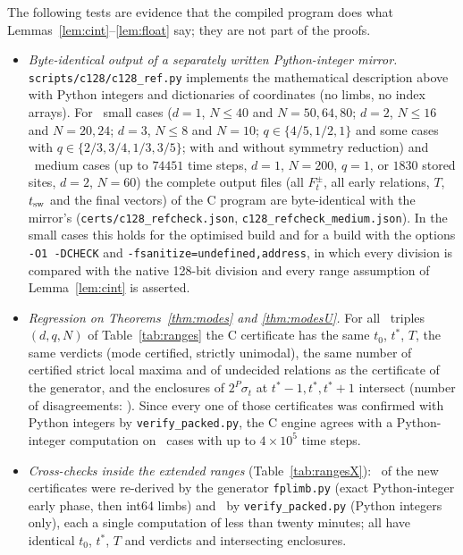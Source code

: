 The following tests are evidence that the compiled program does what Lemmas~\ref{lem:cint}--\ref{lem:float} say; they are not part of the proofs.
\begin{itemize}
\item[(V1)] \emph{Byte-identical output of a separately written Python-integer mirror.} \texttt{scripts/c128/c128\_ref.py} implements the mathematical description above with Python integers and dictionaries of coordinates (no limbs, no index arrays). For \XRefSmall\ small cases ($d=1$, $N\le40$ and $N=50,64,80$; $d=2$, $N\le16$ and $N=20,24$; $d=3$, $N\le8$ and $N=10$; $q\in\{4/5,1/2,1\}$ and some cases with $q\in\{2/3,3/4,1/3,3/5\}$; with and without symmetry reduction) and \XRefMedium\ medium cases (up to $74451$ time steps, $d=1$, $N=200$, $q=1$, or $1830$ stored sites, $d=2$, $N=60$) the complete output files (all $F^\pm_t$, all early relations, $T$, $t_{\rm sw}$ and the final vectors) of the C program are byte-identical with the mirror's (\texttt{certs/c128\_refcheck.json}, \texttt{c128\_refcheck\_medium.json}). In the small cases this holds for the optimised build and for a build with the options \texttt{-O1 -DCHECK} and \texttt{-fsanitize=undefined,address}, in which every division is compared with the native 128-bit division and every range assumption of Lemma~\ref{lem:cint} is asserted.
\item[(V2)] \emph{Regression on Theorems~\ref{thm:modes} and \ref{thm:modesU}.} For all \TotalCerts\ triples $(d,q,N)$ of Table~\ref{tab:ranges} the C certificate has the same $t_0$, $t^*$, $T$, the same verdicts (mode certified, strictly unimodal), the same number of certified strict local maxima and of undecided relations as the certificate of the generator, and the enclosures of $2^P\sigma_t$ at $t^*-1,t^*,t^*+1$ intersect (number of disagreements: \XRegressBad). Since every one of those certificates was confirmed with Python integers by \texttt{verify\_packed.py}, the C engine agrees with a Python-integer computation on \TotalCerts\ cases with up to $4\times10^5$ time steps.
\item[(V3)] \emph{Cross-checks inside the extended ranges} (Table~\ref{tab:rangesX}): \XXLimb\ of the new certificates were re-derived by the generator \texttt{fplimb.py} (exact Python-integer early phase, then int64 limbs) and \XXPacked\ by \texttt{verify\_packed.py} (Python integers only), each a single computation of less than twenty minutes; all have identical $t_0$, $t^*$, $T$ and verdicts and intersecting enclosures.

\end{itemize}

